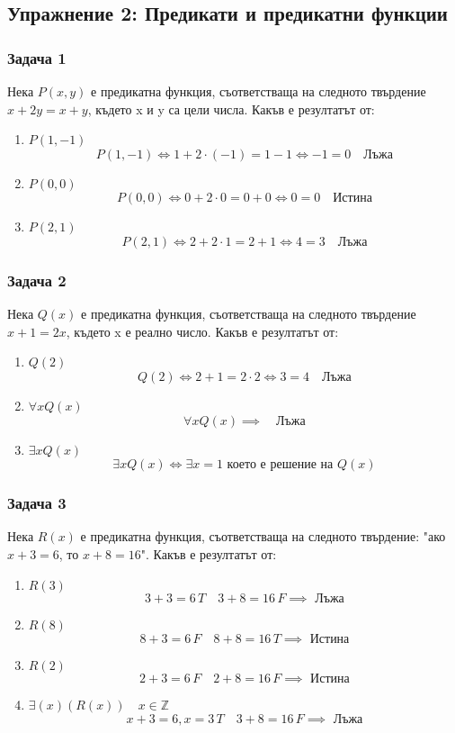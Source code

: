\documentclass[fleqn, 12pt]{article}
\theoremstyle{definition}
\begin{document}
\newpage
\subsection{Упражнение 2: Предикати и предикатни функции}

\subsubsection*{Задача 1}
Нека $P(x,y)$ е  предикатна  функция,  съответстваща  на  следното твърдение $x + 2y = x+y$, където x и y са цели числа.  Какъв е резултатът от:
\begin{enumerate}
\item $P(1,-1)$
$$P(1,-1) \Leftrightarrow 1 + 2 \cdot (-1) = 1 - 1  \Leftrightarrow -1 = 0 \quad \text{Лъжа}$$  
\item $P(0,0)$
$$P(0,0) \Leftrightarrow 0 + 2 \cdot 0= 0 + 0  \Leftrightarrow 0 = 0 \quad \text{Истина}$$  
\item $P(2,1)$
$$P(2,1) \Leftrightarrow 2 + 2 \cdot 1 = 2 + 1 \Leftrightarrow 4 = 3 \quad \text{Лъжа}$$  
\end{enumerate}

\subsubsection*{Задача 2}
Нека $Q(x)$ е предикатна функция, съответстваща на следното твърдение $x+1 = 2x$, където x е реално число.  Какъв е резултатът от:
\begin{enumerate}
\item $Q(2)$
$$Q(2) \Leftrightarrow 2+1 = 2 \cdot 2 \Leftrightarrow 3 = 4 \quad \text{Лъжа}$$  
\item $\forall x Q(x)$
$$\forall x Q(x) \implies \quad \text{Лъжа}$$  
\item $\exists x Q(x)$
$$\exists x Q(x) \Leftrightarrow \exists x = 1 \text{ което е решение на } Q(x)$$  
\end{enumerate}

\subsubsection*{Задача 3}
Нека $R(x)$ е предикатна функция, съответстваща на следното твърдение: "ако $x+3 = 6$, то $x + 8 = 16$". Какъв е резултатът от:
\begin{enumerate}
\item $R(3)$
$$3 + 3 = 6 \, T \quad 3+8 = 16 \, F \implies \text{ Лъжа}$$  
\item $R(8)$
$$8 + 3 = 6 \, F \quad 8+8 = 16 \, T \implies \text{ Истина}$$  
\item $R(2)$
$$2 + 3 = 6 \, F \quad 2+8 = 16 \, F \implies \text{ Истина}$$  
\item $\exists (x)(R(x)) \quad x \in \mathbb{Z}$
$$x + 3 = 6, x=3 \, T \quad 3+8 = 16 \, F \implies \text{ Лъжа}$$  
\end{enumerate}
\end{document}
